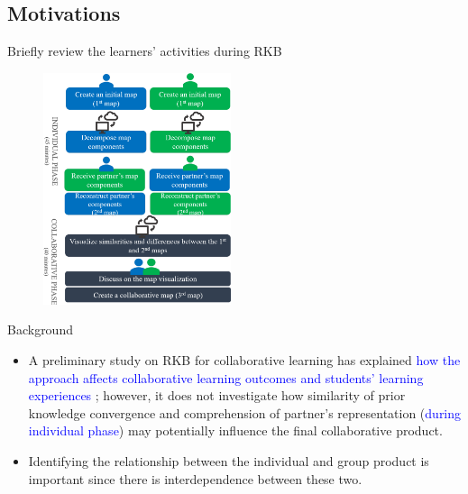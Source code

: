 \subsection{Motivations}

\begin{frame}{Briefly review the learners' activities during RKB}

\begin{figure}[tb]
    \begin{center}
        \includegraphics[width=55mm]{images/rqb_learner-activities.pdf}
    \end{center}
\end{figure}
       
\end{frame}

\begin{frame}{Background}

\begin{itemize}
    \item A preliminary study on RKB for collaborative learning has explained \textcolor{blue}{how the approach affects collaborative learning outcomes and students’ learning experiences \cite{Sadita2018PreliminaryLearning}}; however, it does not investigate how similarity of prior knowledge convergence and comprehension of partner's representation (\textcolor{blue}{during individual phase}) may potentially influence the final collaborative product.
    \item Identifying the relationship between the individual and group product is important since there is interdependence between these two. 
\end{itemize}
       
\end{frame}

